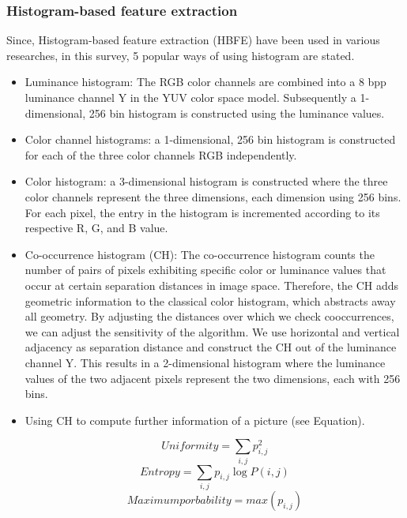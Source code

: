 \documentclass{article}
\begin{document}
	\subsubsection{Histogram-based feature extraction}
	Since, Histogram-based feature extraction (HBFE) have been used in various researches, in this survey, 5 popular ways of using histogram are stated. 
	\begin{itemize}
		\item Luminance histogram: The RGB color channels are combined into a 8 bpp luminance channel Y in the YUV color space model. Subsequently a 1-dimensional, 256 bin histogram is constructed
		using the luminance values.
		\item Color channel histograms: a 1-dimensional, 256
		bin histogram is constructed for each of the three
		color channels RGB independently.
		\item Color histogram: a 3-dimensional histogram is
		constructed where the three color channels represent the three dimensions, each dimension using 256 bins. For each pixel, the entry in the histogram is incremented according to its respective R, G, and B value.
		\item Co-occurrence histogram (CH): The co-occurrence histogram \cite{CH} counts the number of pairs
		of pixels exhibiting specific color or luminance
		values that occur at certain separation distances
		in image space. Therefore, the CH adds geometric information to the classical color histogram, which abstracts away all geometry. By
		adjusting the distances over which we check cooccurrences, we can adjust the sensitivity of the
		algorithm. We use horizontal and vertical adjacency as separation distance and construct the
		CH out of the luminance channel Y. This results
		in a 2-dimensional histogram where the luminance values of the two adjacent pixels represent
		the two dimensions, each with 256 bins.
		\item Using CH to compute further information of a picture (see Equation).
		\begin{multicols}{2}
			\begin{equation}
				Uniformity = \sum_{i, j} p_{i, j}^2
				\label{eq:uniformity}
			\end{equation}\break
			\begin{equation}
				Entropy = \sum_{i, j} p_{i, j} \log P(i, j)
				\label{eq:entropy}
			\end{equation}\break
			\begin{equation}
				Maximum porbability = max(p_{i, j})
				\label{eq:max}

\end{equation}
\end{multicols}
\end{itemize}
\end{document}
